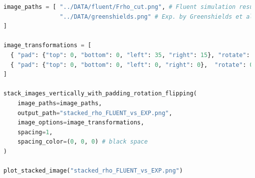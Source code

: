 \documentclass[12pt]{article}
\begin{document}
\begin{lstlisting}[language=Python, caption=Script to stack and plot numerical results of FLUENT and experimental data., label=lst:FLUENT_vs_EXP_stack]
image_paths = [ "../DATA/fluent/Frho_cut.png", # Fluent simulation results
                "../DATA/greenshields.png" # Exp. by Greenshields et al.
]

image_transformations = [
  { "pad": {"top": 0, "bottom": 0, "left": 35, "right": 15}, "rotate": 0 }
  { "pad": {"top": 0, "bottom": 0, "left": 0, "right": 0},  "rotate": 0 }
]

stack_images_vertically_with_padding_rotation_flipping(
    image_paths=image_paths,
    output_path="stacked_rho_FLUENT_vs_EXP.png",
    image_options=image_transformations,
    spacing=1,
    spacing_color=(0, 0, 0) # black space
)

plot_stacked_image("stacked_rho_FLUENT_vs_EXP.png")
\end{lstlisting}

\end{document}
